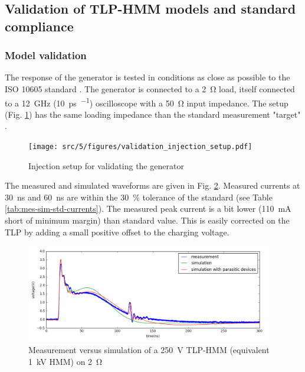 \subsection{Validation of TLP-HMM models and standard compliance}

\subsubsection{Model validation}

The response of the generator is tested in conditions as close as possible to the ISO 10605 standard \cite{iso10605}.
The generator is connected to a \SI{2}{\ohm} load, itself connected to a \SI{12}{\giga\hertz} (\SI{10}{\pico\second\per\sample}) oscilloscope with a \SI{50}{\ohm} input impedance.
The setup (Fig. \ref{fig:injection_setup_validation}) has the same loading impedance than the standard measurement "target" \cite{iso10605, iec61000-4-2}.

\begin{figure}[!h]
  \centering
  \texttt{[image: src/5/figures/validation\_injection\_setup.pdf]}
  \caption{Injection setup for validating the generator}
  \label{fig:injection_setup_validation}
\end{figure}

The measured and simulated waveforms are given in Fig. \ref{fig:tlp_hmm_waveforms}.
Measured currents at \SI{30}{\nano\second} and \SI{60}{\nano\second} are within the \SI{30}{\percent} tolerance of the standard (see Table \ref{tab:mes-sim-std-currents}).
The measured peak current is a bit lower (\SI{110}{\milli\ampere} short of minimum margin) than standard value.
This is easily corrected on the TLP by adding a small positive offset to the charging voltage.

\begin{figure}[!h]
  \centering
  \includegraphics[width=0.95\textwidth]{src/5/figures/tlp_hmm_waveforms.png}
  \caption{Measurement versus simulation of a \SI{250}{\volt} TLP-HMM (equivalent \SI{1}{\kilo\volt} HMM) on \SI{2}{\ohm}}
  \label{fig:tlp_hmm_waveforms}
\end{figure}

